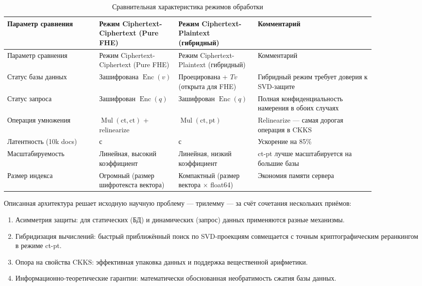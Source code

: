 \documentclass[a4paper, 12pt, oneside, openany]{article}
\begin{document}
\begingroup\small\setlength{\tabcolsep}{3pt}
\begin{longtable}{@{}
		>{\raggedright\arraybackslash}p{0.22\linewidth}
		>{\raggedright\arraybackslash}p{0.19\linewidth}
		>{\raggedright\arraybackslash}p{0.19\linewidth}
		>{\raggedright\arraybackslash}p{0.28\linewidth}
		@{}}
	\caption{Сравнительная характеристика режимов обработки}\label{tab:4-1}\\*
	\toprule
	Параметр сравнения &
	Режим Ciphertext-Ciphertext (Pure FHE) &
	Режим Ciphertext-Plaintext (гибридный) &
	Комментарий \\
	\midrule
	\endfirsthead
	
	\toprule
	Параметр сравнения &
	Режим Ciphertext-Ciphertext (Pure FHE) &
	Режим Ciphertext-Plaintext (гибридный) &
	Комментарий \\
	\midrule
	\endhead
	
	\bottomrule
	\endfoot
	
	\bottomrule
	\endlastfoot
	
	Статус базы данных &
	Зашифрована $\operatorname{Enc}(v)$ &
	Проецирована + $Tv$ (открыта для FHE) &
	Гибридный режим требует доверия к SVD-защите \\
	
	Статус запроса &
	Зашифрован $\operatorname{Enc}(q)$ &
	Зашифрован $\operatorname{Enc}(q)$ &
	Полная конфиденциальность намерения в обоих случаях \\
	
	Операция умножения &
	$\operatorname{Mul}(\mathrm{ct}, \mathrm{ct})$ + relinearize &
	$\operatorname{Mul}(\mathrm{ct}, \mathrm{pt})$ &
	Relinearize --- самая дорогая операция в CKKS \\
	
	Латентность (10k docs) &
	1.80 с &
	0.96 с &
	Ускорение на 85\% \\
	
	Масштабируемость &
	Линейная, высокий коэффициент &
	Линейная, низкий коэффициент &
	ct-pt лучше масштабируется на большие базы \\
	
	Размер индекса &
	Огромный (размер шифротекста вектора) &
	Компактный (размер вектора $\times$ float64) &
	Экономия памяти сервера \\
	
\end{longtable}
\endgroup

Описанная архитектура решает исходную научную проблему — трилемму — за счёт сочетания нескольких приёмов:
\begin{enumerate}
	\def\labelenumi{\arabic{enumi}.}
	\item
	Асимметрия защиты: для статических (БД) и динамических (запрос) данных применяются разные механизмы.
	\item
	Гибридизация вычислений: быстрый приближённый поиск по SVD-проекциям совмещается с точным криптографическим реранкингом в режиме ct-pt.
	\item
	Опора на свойства CKKS: эффективная упаковка данных и поддержка вещественной арифметики.
	\item
	Информационно-теоретические гарантии: математически обоснованная необратимость сжатия базы данных.
\end{enumerate}
\end{document}
